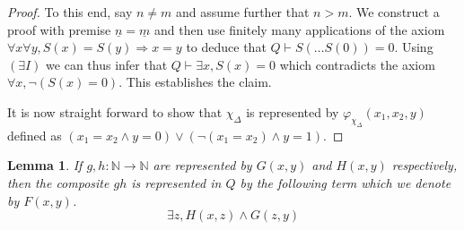 \documentclass[12pt]{article}
\theoremstyle{plain}
\newtheorem{lemma}[thm]{Lemma}
\theoremstyle{definition}
\newcommand{\bb}[1]{\mathbb{#1}}
\newcommand{\lto}{\longrightarrow}
\begin{document}
\begin{proof}
		To this end, say $n \neq m$ and assume further that $n > m$. We construct a proof with premise $\underline{n} = \underline{m}$ and then use finitely many applications of the axiom $\forall x \forall y, S(x) = S(y) \Longrightarrow x = y$ to deduce that $Q \vdash S(\hdots S(0)) = 0$. Using $(\exists I)$ we can thus infer that $Q\vdash \exists x, S(x) = 0$ which contradicts the axiom $\forall x, \neg(S(x) = 0)$. This establishes the claim.
		
		It is now straight forward to show that $\chi_\Delta$ is represented by $\varphi_{\chi_{\Delta}}(x_1,x_2,y)$ defined as $(x_1 = x_2 \wedge y = 0) \vee (\neg (x_1 = x_2) \wedge y = 1 )$.
	\end{proof}
	\begin{lemma}\label{lem:rep_comp_single}
		If $g,h: \bb{N} \lto \bb{N}$ are represented by $G(x,y)$ and $H(x,y)$ respectively, then the composite $g h$ is represented in $Q$ by the following term which we denote by $F(x,y)$.
		\begin{equation}
			\exists z, H(x,z) \wedge G(z,y)
		\end{equation}
	\end{lemma}
\end{document}
